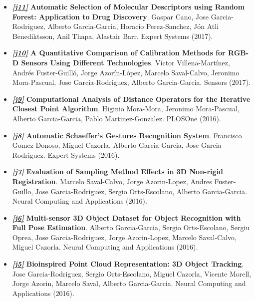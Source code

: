 \documentclass[8pt]{article}
\begin{document}
\begin{itemize}
    \item \emph{\textbf{\href{http://www.sciencedirect.com/science/article/pii/S0957417416306819}{[j11]}}} \textbf{Automatic Selection of Molecular Descriptors using Random Forest: Application to Drug Discovery}. Gaspar Cano, Jose Garcia-Rodriguez, Alberto Garcia-Garcia, Horacio Perez-Sanchez, Jón Atli Benediktsson, Anil Thapa, Alastair Barr. Expert Systems (2017).
    \item \emph{\textbf{\href{http://www.mdpi.com/1424-8220/17/2/243/htm}{[j10]}}} \textbf{A Quantitative Comparison of Calibration Methods for RGB-D Sensors Using Different Technologies}. Víctor Villena-Martínez, Andrés Fuster-Guilló, Jorge Azorín-López, Marcelo Saval-Calvo, Jeronimo Mora-Pascual, Jose Garcia-Rodriguez, Alberto Garcia-Garcia. Sensors (2017).
    \item \emph{\textbf{\href{http://journals.plos.org/plosone/article?id=10.1371/journal.pone.0164694}{[j9]}}} \textbf{Computational Analysis of Distance Operators for the Iterative Closest Point Algorithm}. Higinio Mora-Mora, Jeronimo Mora-Pascual, Alberto Garcia-Garcia, Pablo Martinez-Gonzalez. PLOSOne (2016).
    \item \emph{\textbf{\href{http://onlinelibrary.wiley.com/doi/10.1111/exsy.12160/abstract}{[j8]}}} \textbf{Automatic Schaeffer's Gestures Recognition System}. Francisco Gomez‐Donoso, Miguel Cazorla, Alberto Garcia‐Garcia, Jose Garcia‐Rodriguez. Expert Systems (2016).
    \item \emph{\textbf{\href{http://link.springer.com/article/10.1007/s00521-016-2258-z}{[j7]}}} \textbf{Evaluation of Sampling Method Effects in 3D Non-rigid Registration}. Marcelo Saval-Calvo, Jorge Azorin-Lopez, Andres Fuster-Guillo, Jose Garcia-Rodriguez, Sergio Orts-Escolano, Alberto Garcia-Garcia. Neural Computing and Applications (2016).
    \item \emph{\textbf{\href{http://link.springer.com/article/10.1007/s00521-016-2224-9}{[j6]}}} \textbf{Multi-sensor 3D Object Dataset for Object Recognition with Full Pose Estimation}. Alberto Garcia-Garcia, Sergio Orts-Escolano, Sergiu Oprea, Jose Garcia-Rodriguez, Jorge Azorin-Lopez, Marcelo Saval-Calvo, Miguel Cazorla. Neural Computing and Applications (2016).
    \item \emph{\textbf{\href{http://link.springer.com/article/10.1007/s00521-016-2585-0}{[j5]}}} \textbf{Bioinspired Point Cloud Representation: 3D Object Tracking}. Jose Garcia-Rodriguez, Sergio Orts-Escolano, Miguel Cazorla, Vicente Morell, Jorge Azorin, Marcelo Saval, Alberto Garcia-Garcia. Neural Computing and Applications (2016).

\end{itemize}
\end{document}

